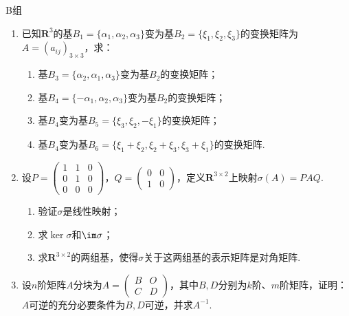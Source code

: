 \centerline{\heiti B组}
\begin{enumerate}
    \item 已知$\mathbf{R}^3$的基$B_1=\{\alpha_1,\alpha_2,\alpha_3\}$变为基$B_2=\{\xi_1,\xi_2,\xi_3\}$的变换矩阵为$A=(a_{ij})_{3 \times 3}$，求：
          \begin{enumerate}
              \item 基$B_3=\{\alpha_2,\alpha_1,\alpha_3\}$变为基$B_2$的变换矩阵；

              \item 基$B_4=\{-\alpha_1,\alpha_2,\alpha_3\}$变为基$B_2$的变换矩阵；

              \item 基$B_4$变为基$B_5=\{\xi_3,\xi_2,-\xi_1\}$的变换矩阵；

              \item 基$B_4$变为基$B_6=\{\xi_1+\xi_2,\xi_2+\xi_3,\xi_3+\xi_1\}$的变换矩阵.
          \end{enumerate}

    \item 设$P=\begin{pmatrix}
                  1 & 1 & 0 \\ 0 & 1 & 0 \\ 0 & 0 & 0
              \end{pmatrix}$，$Q=\begin{pmatrix}
                  0 & 0 \\ 1 & 0
              \end{pmatrix}$，定义$\mathbf{R}^{3\times 2}$上映射$\sigma(A)=PAQ$.
          \begin{enumerate}
              \item 验证$\sigma$是线性映射；

              \item 求$\ker\sigma$和$\im \sigma$；

              \item 求$\mathbf{R}^{3\times 2}$的两组基，使得$\sigma$关于这两组基的表示矩阵是对角矩阵.
          \end{enumerate}

    \item 设$n$阶矩阵$A$分块为$A=\begin{pmatrix}
                  B & O \\ C & D
              \end{pmatrix}$，其中$B,D$分别为$k$阶、$m$阶矩阵，证明：$A$可逆的充分必要条件为$B,D$可逆，并求$A^{-1}$.
\end{enumerate}

